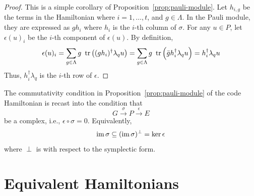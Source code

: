 \begin{proof}
This is a simple corollary of Proposition~\ref{prop:pauli-module}.
Let $h_{i,g}$ be the terms in the Hamiltonian where $i = 1,\ldots, t$, and $ g \in \Lambda $.
In the Pauli module, they are expressed as $g h_i$ where $h_i$ is the $i$-th column of $\sigma$.
For any $u \in P$, let $\epsilon(u)_i$ be the $i$-th component of $\epsilon(u)$. By definition,
\[
 \epsilon( u )_i 
= \sum_{g \in \Lambda} g~ \mathop{\mathrm{tr}}\nolimits \left( (g h_i)^\dagger \lambda_q u \right)
= \sum_{g \in \Lambda} g~ \mathop{\mathrm{tr}}\nolimits \left( \bar g h_i^\dagger \lambda_q u  \right)
= h_i^\dagger \lambda_q u
\]
Thus, $h_i^\dagger \lambda_q$ is the $i$-th row of $\epsilon$.
\end{proof}

\begin{rem}
The commutativity condition in Proposition~\ref{prop:pauli-module} of the code Hamiltonian
is recast into the condition that
\[
 G \xrightarrow{\sigma} P \xrightarrow{\epsilon} E
\]
be a complex, i.e., $\epsilon \circ \sigma = 0$.
Equivalently,
\[
 \mathop{\mathrm{im}}\nolimits \sigma \subseteq (\mathop{\mathrm{im}}\nolimits \sigma)^\perp = \ker \epsilon
\]
where $\perp$ is with respect to the symplectic form.
\end{rem}





\section{Equivalent Hamiltonians}
\label{sec:equivalent-hamiltonians}

